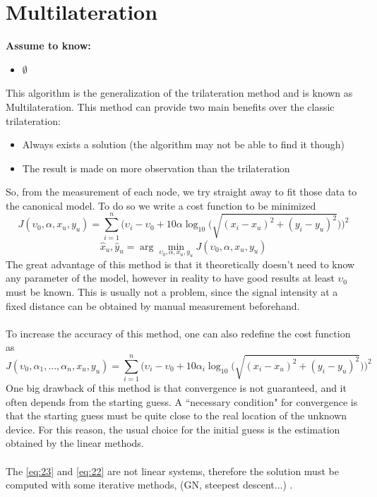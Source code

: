 \documentclass[12pt,twoside]{report}
\begin{document}
\section{Multilateration}
  \begin{center}
  \textbf{Assume to know:}
  \begin{itemize}
    \centering
    \item $\emptyset$
  \end{itemize}
  \end{center}
This algorithm is the generalization of the trilateration method and is known as Multilateration. 
This method can provide two main benefits over the classic trilateration:
\begin{itemize}
    \item Always exists a solution (the algorithm may not be able to find it though)
    \item The result is made on more observation than the trilateration
\end{itemize}
So, from the measurement of each node, we try straight away to fit those data to the canonical model. To do so we write a cost function to be minimized
\begin{equation}
    J(\upsilon_0,\alpha,x_u,y_u)=\sum_{i=1}^n\bigg(\upsilon_i-\upsilon_0+10\alpha\log_{10}\big(\sqrt{(x_i-x_u)^2+(y_i-y_u)^2}\big)\bigg)^2
    \label{eq:23}
\end{equation}
\begin{equation}
\hat{x}_u, \hat{y}_u=\arg \min_{\upsilon_0,\alpha,x_u,y_u}J(\upsilon_0,\alpha,x_u,y_u)
\end{equation}
The great advantage of this method is that it theoretically doesn't need to know any parameter of the model, however in reality to have good results at least $\upsilon_0$ must be known. This is usually not a problem, since the signal intensity at a fixed distance can be obtained by manual measurement beforehand.\\\\
To increase the accuracy of this method, one can also redefine the cost function as
\begin{equation}
    J(\upsilon_0,\alpha_1,...,\alpha_n,x_u,y_u)=\sum_{i=1}^n\bigg(\upsilon_i-\upsilon_0+10\alpha_i\log_{10}\big(\sqrt{(x_i-x_u)^2+(y_i-y_u)^2}\big)\bigg)^2
    \label{eq:22}
\end{equation}
One big drawback of this method is that convergence is not guaranteed, and it often depends from the starting guess. A ``necessary condition" for convergence is that the starting guess must be quite close to the real location of the unknown device. For this reason, the usual choice for the initial guess is the estimation obtained by the linear methods.\\\\ 
The \ref{eq:23} and \ref{eq:22} are not linear systems, therefore the solution must be computed with some iterative methods, (GN, steepest descent...) \cite{chong2013introduction}.
\clearpage
\end{document}
